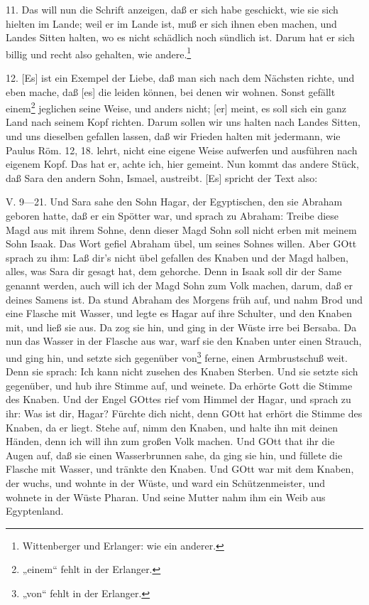 11. Das will nun die Schrift anzeigen, daß er sich habe geschickt, wie sie sich hielten im Lande; weil er im Lande ist, muß er sich ihnen eben machen, und Landes Sitten halten, wo es nicht schädlich noch sündlich ist. Darum hat er sich billig und recht also gehalten, wie andere.\footnote{Wittenberger und Erlanger: wie ein anderer.}

12. [Es] ist ein Exempel der Liebe, daß man sich nach dem Nächsten richte, und eben mache, daß [es] die leiden können, bei denen wir wohnen. Sonst gefällt einem\footnote{„einem“ fehlt in der Erlanger.} jeglichen seine Weise, und anders nicht; [er] meint, es soll sich ein ganz Land nach seinem Kopf richten. Darum sollen wir uns halten nach Landes Sitten, und uns dieselben gefallen lassen, daß wir Frieden halten mit jedermann, wie Paulus Röm. 12, 18. lehrt, nicht eine eigene Weise aufwerfen und ausführen nach eigenem Kopf. Das hat er, achte ich, hier gemeint. Nun kommt das andere Stück, daß Sara den andern Sohn, Ismael, austreibt. [Es] spricht der Text also:

\begin{schriftzitat}
V. 9—21. Und Sara sahe den Sohn Hagar, der Egyptischen, den sie Abraham geboren hatte, daß er ein Spötter war, und sprach zu Abraham: Treibe diese Magd aus mit ihrem Sohne, denn dieser Magd Sohn soll nicht erben mit meinem Sohn Isaak. Das Wort gefiel Abraham übel, um seines Sohnes willen. Aber GOtt sprach zu ihm: Laß dir’s nicht übel gefallen des Knaben und der Magd halben, alles, was Sara dir gesagt hat, dem gehorche. Denn in Isaak soll dir der Same genannt werden, auch will ich der Magd Sohn zum Volk machen, darum, daß er deines Samens ist. Da stund Abraham des Morgens früh auf, und nahm Brod und eine Flasche mit Wasser, und legte es Hagar auf ihre Schulter, und den Knaben mit, und ließ sie aus. Da zog sie hin, und ging in der Wüste irre bei Bersaba. Da nun das Wasser in der Flasche aus war, warf sie den Knaben unter einen Strauch, und ging hin, und setzte sich gegenüber von\footnote{„von“ fehlt in der Erlanger.} ferne, einen Armbrustschuß weit. Denn sie sprach: Ich kann nicht zusehen des Knaben Sterben. Und sie setzte sich gegenüber, und hub ihre Stimme auf, und weinete. Da erhörte Gott die Stimme des Knaben. Und der Engel GOttes rief vom Himmel der Hagar, und sprach zu ihr: Was ist dir, Hagar? Fürchte dich nicht, denn GOtt hat erhört die Stimme des Knaben, da er liegt. Stehe auf, nimm den Knaben, und halte ihn mit deinen Händen, denn ich will ihn zum großen Volk machen. Und GOtt that ihr die Augen auf, daß sie einen Wasserbrunnen sahe, da ging sie hin, und füllete die Flasche mit Wasser, und tränkte
den Knaben. Und GOtt war mit dem Knaben, der wuchs, und wohnte in der Wüste, und ward ein Schützenmeister, und wohnete in der Wüste Pharan. Und seine Mutter nahm ihm ein Weib aus Egyptenland.
\end{schriftzitat}

